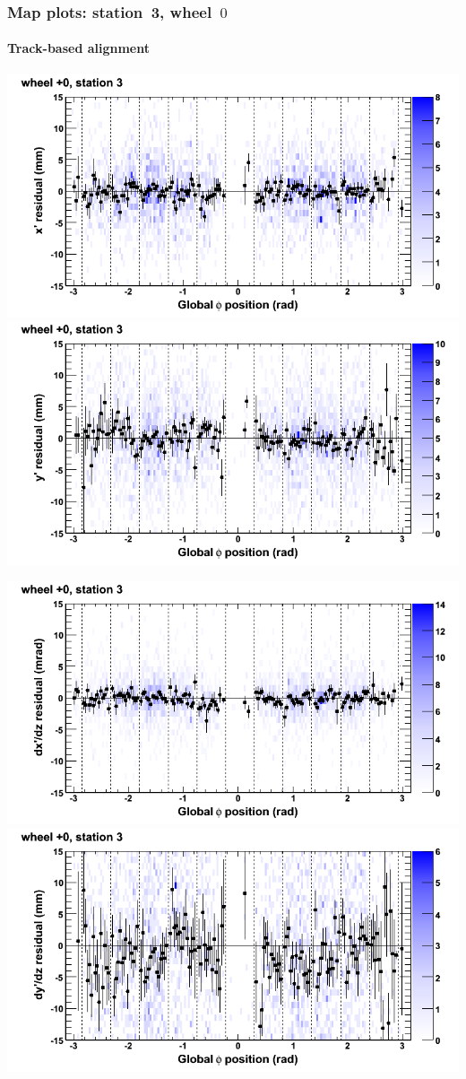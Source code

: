 \documentclass[compress]{beamer}
\begin{document}
\begin{frame}
\frametitle{Map plots: station~3, wheel~$0$}
\framesubtitle{Track-based alignment}
\includegraphics[width=0.5\linewidth]{mapplots_re05/DTvsphi_st3whC_x.png}
\includegraphics[width=0.5\linewidth]{mapplots_re05/DTvsphi_st3whC_y.png}

\includegraphics[width=0.5\linewidth]{mapplots_re05/DTvsphi_st3whC_dxdz.png}
\includegraphics[width=0.5\linewidth]{mapplots_re05/DTvsphi_st3whC_dydz.png}
\end{frame}
\end{document}
